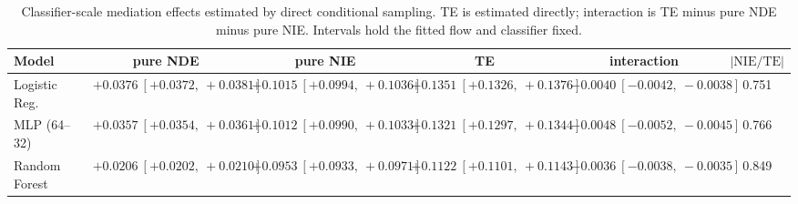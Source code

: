 \begin{table}[htbp]
  \centering
  \caption{Classifier-scale mediation effects estimated by direct conditional sampling. TE is estimated directly; interaction is TE minus pure NDE minus pure NIE. Intervals hold the fitted flow and classifier fixed.}
  \label{tab:german_synth_m05_gap_overall}
  \begin{tabular}{lccccc}
    \toprule
    Model & pure NDE & pure NIE & TE & interaction & $|\mathrm{NIE}/\mathrm{TE}|$ \\
    \midrule
    Logistic Reg. & $+0.0376\ [+0.0372,\ +0.0381]$ & $+0.1015\ [+0.0994,\ +0.1036]$ & $+0.1351\ [+0.1326,\ +0.1376]$ & $-0.0040\ [-0.0042,\ -0.0038]$ & 0.751 \\
    MLP (64--32) & $+0.0357\ [+0.0354,\ +0.0361]$ & $+0.1012\ [+0.0990,\ +0.1033]$ & $+0.1321\ [+0.1297,\ +0.1344]$ & $-0.0048\ [-0.0052,\ -0.0045]$ & 0.766 \\
    Random Forest & $+0.0206\ [+0.0202,\ +0.0210]$ & $+0.0953\ [+0.0933,\ +0.0971]$ & $+0.1122\ [+0.1101,\ +0.1143]$ & $-0.0036\ [-0.0038,\ -0.0035]$ & 0.849 \\
    \bottomrule
  \end{tabular}
\end{table}